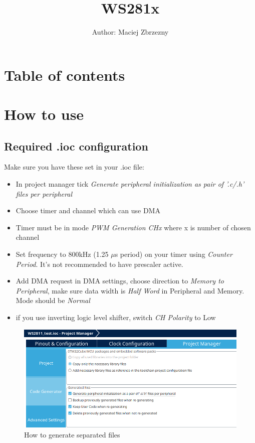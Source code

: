 \documentclass[]{article}
\title{WS281x}
\author{Author: Maciej Zbrzezny}
\date{}
\begin{document}
	\maketitle
	\pagestyle{fancy}
	\lhead{}
	\chead{}
	\lfoot{}
	\section*{Table of contents}
	\cfoot{\hyperlink{}{\thepage}}
	\tableofcontents
	\newpage
	\section{How to use}
	\subsection{Required .ioc configuration}
	Make sure you have these set in your .ioc file:
	\begin{itemize}
		\item In project manager tick \textit{Generate peripheral initialization as pair of '.c/.h' files per peripheral}
		\item Choose timer and channel which can use DMA
		\item Timer must be in mode \textit{PWM Generation CHx} where x is number of chosen channel
		\item Set frequency to 800kHz (1.25 $\mu$s period) on your timer using \textit{Counter Period}. It's not recommended to have prescaler active.
		\item Add DMA request in DMA settings, choose direction to \textit{Memory to Peripheral}, make sure data width is \textit{Half Word} in Peripheral and Memory. Mode should be \textit{Normal} 
		\item if you use inverting logic level shifter, switch \textit{CH Polarity} to Low
	\end{itemize}
	\begin{minipage}{0.5\textwidth}
		\begin{figure}[H]
			\centering
			\includegraphics[width=0.9\linewidth]{separatedfiles}
			\caption{How to generate separated files}
			\label{fig:separatedfiles}
		\end{figure}
				
	\end{minipage}
\end{document}
